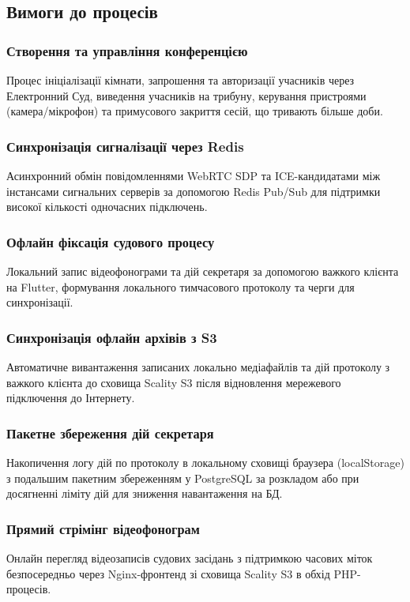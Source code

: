 \documentclass{article}
\begin{document}
\subsection{Вимоги до процесів}

\subsubsection{Створення та управління конференцією}
Процес ініціалізації кімнати, запрошення та авторизації учасників через Електронний Суд, виведення учасників на трибуну, керування пристроями (камера/мікрофон) та примусового закриття сесій, що тривають більше доби.

\subsubsection{Синхронізація сигналізації через Redis}
Асинхронний обмін повідомленнями WebRTC SDP та ICE-кандидатами між інстансами сигнальних серверів за допомогою Redis Pub/Sub для підтримки високої кількості одночасних підключень.

\subsubsection{Офлайн фіксація судового процесу}
Локальний запис відеофонограми та дій секретаря за допомогою важкого клієнта на Flutter, формування локального тимчасового протоколу та черги для синхронізації.

\subsubsection{Синхронізація офлайн архівів з S3}
Автоматичне вивантаження записаних локально медіафайлів та дій протоколу з важкого клієнта до сховища Scality S3 після відновлення мережевого підключення до Інтернету.

\subsubsection{Пакетне збереження дій секретаря}
Накопичення логу дій по протоколу в локальному сховищі браузера (localStorage) з подальшим пакетним збереженням у PostgreSQL за розкладом або при досягненні ліміту дій для зниження навантаження на БД.

\subsubsection{Прямий стрімінг відеофонограм}
Онлайн перегляд відеозаписів судових засідань з підтримкою часових міток безпосередньо через Nginx-фронтенд зі сховища Scality S3 в обхід PHP-процесів.
\end{document}
